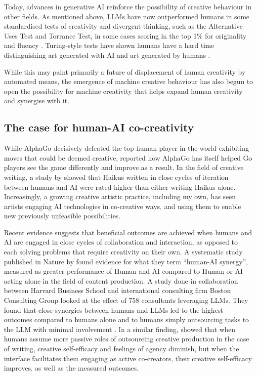 Today, advances in generative AI reinforce the possibility of creative behaviour in other fields. As mentioned above, LLMs have now outperformed humans in some standardised tests of creativity and divergent thinking, such as the Alternative Uses Test and Torrance Test, in some cases scoring in the top 1\% for originality and fluency \citep{Hubert2024-kv, Guzik2023-cl, Koivisto2023-lw}. Turing-style tests have shown humans have a hard time distinguishing art generated with AI and art generated by humans \citep{Alexander2024-pz}. 

While this may paint primarily a future of displacement of human creativity by automated means, the emergence of machine creative behaviour has also begun to open the possibility for machine creativity that helps expand human creativity and synergise with it. 

\subsection{The case for human-AI co-creativity}

While AlphaGo decisively defeated the top human player in the world exhibiting moves that could be deemed creative, \citet{Metz2016-dm} reported how AlphaGo has itself helped Go players see the game differently and improve as a result. In the field of creative writing, a study by \citet{Hitsuwari2023-tw} showed that Haikus written in close cycles of iteration between humans and AI were rated higher than either writing Haikus alone. Increasingly, a growing creative artistic practice, including my own, has seen artists engaging AI technologies in co-creative ways, and using them to enable new previously unfeasible possibilities. 

Recent evidence suggests that beneficial outcomes are achieved when humans and AI are engaged in close cycles of collaboration and interaction, as opposed to each solving problems that require creativity on their own. A systematic study published in Nature by \citet{Vaccaro2024-ne} found evidence for what they term ``human-AI synergy'', measured as greater performance of Human and AI compared to Human or AI acting alone in the field of content production. A study done in collaboration between Harvard Business School and international consulting firm Boston Consulting Group looked at the effect of 758 consultants leveraging LLMs. They found that close synergies between humans and LLMs led to the highest outcomes compared to humans alone and to humans simply outsourcing tasks to the LLM with minimal involvement \citep{DellAcqua2023-og}. In a similar finding, \citet{McGuire2024-im} showed that when humans assume more passive roles of outsourcing creative production in  the case of writing, creative self-efficacy and feelings of agency diminish, but when the interface facilitates them engaging as active co-creators, their creative self-efficacy improves, as well as the measured outcomes. 

